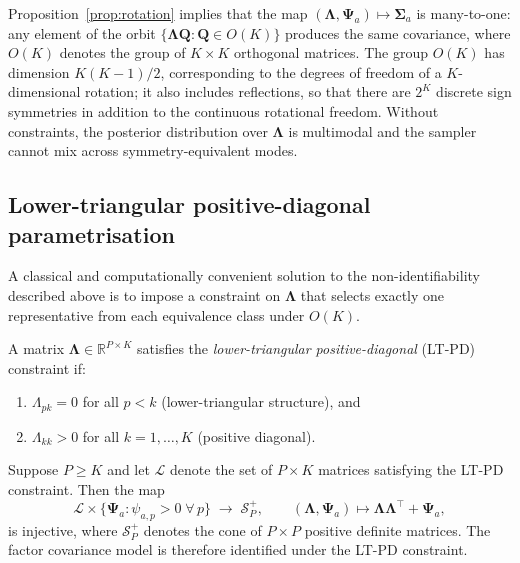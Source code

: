 Proposition~\ref{prop:rotation} implies that the map $(\boldsymbol{\Lambda}, \boldsymbol{\Psi}_a) \mapsto \boldsymbol{\Sigma}_a$ is many-to-one: any element of the orbit $\{\boldsymbol{\Lambda}\mathbf{Q} : \mathbf{Q} \in O(K)\}$ produces the same covariance, where $O(K)$ denotes the group of $K \times K$ orthogonal matrices. The group $O(K)$ has dimension $K(K-1)/2$, corresponding to the degrees of freedom of a $K$-dimensional rotation; it also includes reflections, so that there are $2^K$ discrete sign symmetries in addition to the continuous rotational freedom. Without constraints, the posterior distribution over $\boldsymbol{\Lambda}$ is multimodal and the sampler cannot mix across symmetry-equivalent modes.

\subsection{Lower-triangular positive-diagonal parametrisation}
\label{sec:ltpd}

A classical and computationally convenient solution to the non-identifiability described above is to impose a constraint on $\boldsymbol{\Lambda}$ that selects exactly one representative from each equivalence class under $O(K)$.

\begin{definition}[LT-PD constraint]
\label{def:ltpd}
A matrix $\boldsymbol{\Lambda} \in \mathbb{R}^{P \times K}$ satisfies the \emph{lower-triangular positive-diagonal} (LT-PD) constraint if:
\begin{enumerate}
\item[(i)] $\Lambda_{pk} = 0$ for all $p < k$ \quad (lower-triangular structure), and
\item[(ii)] $\Lambda_{kk} > 0$ for all $k = 1, \ldots, K$ \quad (positive diagonal).
\end{enumerate}
\end{definition}

\begin{proposition}
\label{prop:ltpd_ident}
Suppose $P \geq K$ and let $\mathcal{L}$ denote the set of $P \times K$ matrices satisfying the LT-PD constraint. Then the map
\[
\mathcal{L} \times \{\boldsymbol{\Psi}_a : \psi_{a,p} > 0\;\forall\, p\} \;\longrightarrow\; \mathcal{S}^+_P, \qquad (\boldsymbol{\Lambda},\boldsymbol{\Psi}_a) \mapsto \boldsymbol{\Lambda}\boldsymbol{\Lambda}^\top + \boldsymbol{\Psi}_a,
\]
is injective, where $\mathcal{S}^+_P$ denotes the cone of $P \times P$ positive definite matrices. The factor covariance model is therefore identified under the LT-PD constraint.
\end{proposition}

